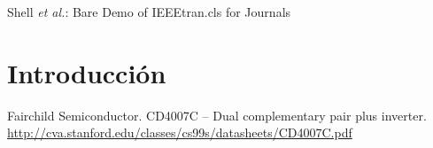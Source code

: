 \documentclass[journal]{IEEEtran}
\begin{document}
\title{}
\author{}

\markboth{}%
{Shell \MakeLowercase{\textit{et al.}}: Bare Demo of IEEEtran.cls for Journals}

\maketitle

\begin{abstract}

\end{abstract}

\begin{IEEEkeywords}

\end{IEEEkeywords}

\IEEEpeerreviewmaketitle

\section{Introducción}


%	
%




%	




\begin{thebibliography}{1}

Fairchild Semiconductor. CD4007C -- Dual complementary pair plus inverter. \url{http://cva.stanford.edu/classes/cs99s/datasheets/CD4007C.pdf}



\end{thebibliography}



%	
%
\end{document}
